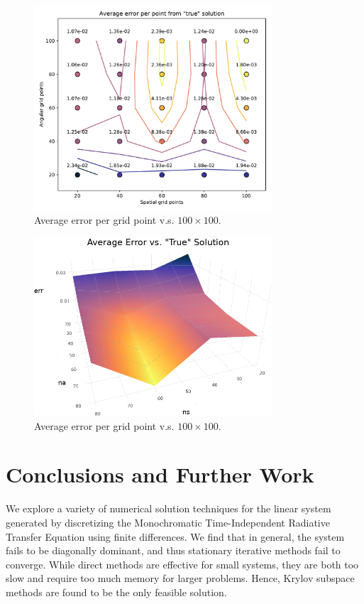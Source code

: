 \documentclass[10pt]{article}
\begin{document}
\begin{multicols}{2}
\begin{figure}[H]
	\centering
	\hspace{-.5in}
	\includegraphics[width=3.5in]{img/avgerr.pdf}
	\caption{Average error per grid point v.s. $100 \times 100$.}
\end{figure}
\begin{figure}[H]
	\centering
	\hspace{-.5in}
	\includegraphics[width=3.5in]{img/avgerr_3d.png}
	\caption{Average error per grid point v.s. $100 \times 100$.}
\end{figure}

\section{Conclusions and Further Work}

We explore a variety of numerical solution techniques for the linear system generated by discretizing the Monochromatic Time-Independent Radiative Transfer Equation using finite differences.
We find that in general, the system fails to be diagonally dominant, and thus stationary iterative methods fail to converge.
While direct methods are effective for small systems, they are both too slow and require too much memory for larger problems.
Hence, Krylov subspace methods are found to be the only feasible solution.


\end{multicols}
\end{document}
